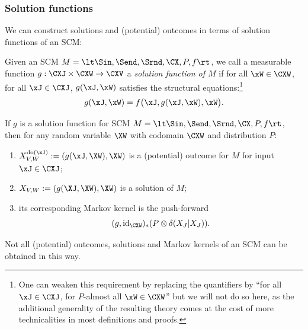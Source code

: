 \subsubsection{Solution functions}
We can construct solutions and (potential) outcomes in terms of solution functions of an SCM:
\begin{Def}\label{def:scm_solution_functions}\label{def:solution-function}
  Given an SCM $M = \lt \Sin, \Send, \Srnd, \CX, P, f \rt$, we call a measurable function
  $g : \CXJ \times \CXW \to \CXV$ a \emph{solution function of $M$} if 
  for all $\xW\in\CXW$, for all $\xJ\in\CXJ$, $g(\xJ,\xW)$ satisfies the structural equations:\footnote{One can weaken this requirement by replacing the quantifiers by ``for all $\xJ\in\CXJ$, for $P$-almost all $\xW\in\CXW$'' but we will not do so here, as the additional generality of the resulting theory comes at the cost of more technicalities in most definitions and proofs.}
  $$g(\xJ,\xW) = f\big(\xJ, g(\xJ,\xW), \xW\big).$$
\end{Def}
\begin{Rem}\label{rem:using_solution_functions}
  If $g$ is a solution function for SCM $M = \lt \Sin, \Send, \Srnd, \CX, P, f \rt$,
  then for any random variable $\XW$ with codomain $\CXW$ and distribution $P$:
  \begin{enumerate}
    \item
      $X_{V,W}^{\doit(\xJ)} := (g(\xJ, \XW),\XW)$ is a (potential) outcome for $M$ for input $\xJ\in\CXJ$;
    \item
      $X_{V,W} := (g(\XJ, \XW),\XW)$ is a solution of $M$;
    \item its corresponding Markov kernel is the push-forward
      $$(g,\id_{\CXW})_* (P \otimes \delta(X_J|X_J)).$$
  \end{enumerate}
\end{Rem}
Not all (potential) outcomes, solutions and Markov kernels of an SCM can be obtained in this way. 
